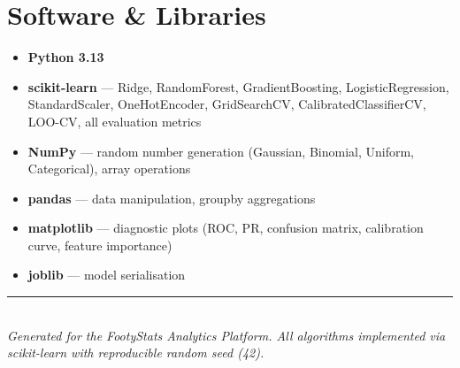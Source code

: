 \documentclass[11pt,a4paper]{article}
\begin{document}
\section{Software \& Libraries}

\begin{itemize}[nosep]
  \item \textbf{Python 3.13}
  \item \textbf{scikit-learn} --- Ridge, RandomForest, GradientBoosting,
        LogisticRegression, StandardScaler, OneHotEncoder, GridSearchCV,
        CalibratedClassifierCV, LOO-CV, all evaluation metrics
  \item \textbf{NumPy} --- random number generation (Gaussian, Binomial,
        Uniform, Categorical), array operations
  \item \textbf{pandas} --- data manipulation, groupby aggregations
  \item \textbf{matplotlib} --- diagnostic plots (ROC, PR, confusion
        matrix, calibration curve, feature importance)
  \item \textbf{joblib} --- model serialisation
\end{itemize}


\vfill
\begin{center}
\rule{0.6\textwidth}{0.4pt}\\[4pt]
{\small\itshape Generated for the FootyStats Analytics Platform.
All algorithms implemented via scikit-learn with reproducible
random seed (42).}
\end{center}
\end{document}
